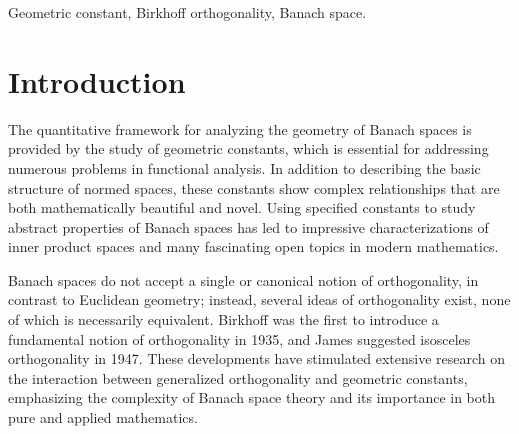 \documentclass[preprint,12pt]{elsarticle}
\numberwithin{equation}{section}
\begin{document}
\begin{frontmatter}


\begin{keyword}
Geometric constant, Birkhoff orthogonality, Banach space. 



\end{keyword}

\end{frontmatter}


\section{Introduction}
The quantitative framework for analyzing the geometry of Banach spaces is provided by the study of geometric constants, which is essential for addressing numerous problems in functional analysis. In addition to describing the basic structure of normed spaces, these constants show complex relationships that are both mathematically beautiful and novel. Using specified constants to study abstract properties of Banach spaces has led to impressive characterizations of inner product spaces and many fascinating open topics in modern mathematics.

Banach spaces do not accept a single or canonical notion of orthogonality, in contrast to Euclidean geometry; instead, several ideas of orthogonality exist, none of which is necessarily equivalent. Birkhoff \cite{birkhoff1935orthogonality} was the first to introduce a fundamental notion of orthogonality in 1935, and James \cite{james1947orthogonality} suggested isosceles orthogonality in 1947. 
These developments have stimulated extensive research on the interaction between generalized orthogonality and geometric constants, emphasizing the complexity of Banach space theory and its importance in both pure and applied mathematics.
\end{document}
